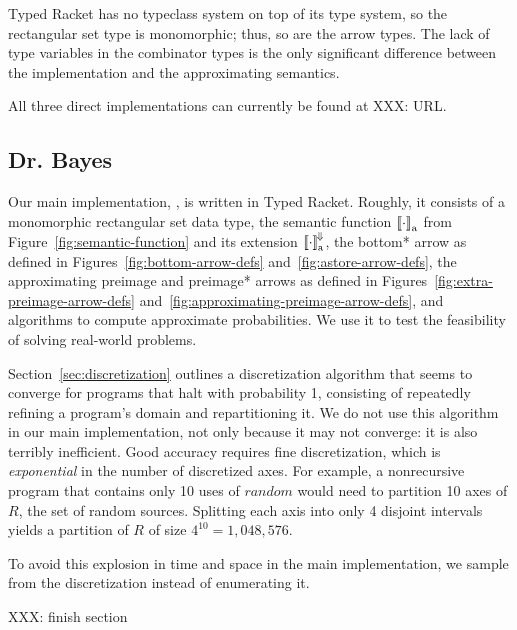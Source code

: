 \documentclass[preprint]{sigplanconf}
\newcommand{\conv}{^{\mspace{-2mu}\Downarrow\mspace{-2mu}}}
\newcommand{\gen}{_\mathrm{a}}
\begin{document}
Typed Racket has no typeclass system on top of its type system, so the rectangular set type is monomorphic; thus, so are the arrow types.
The lack of type variables in the combinator types is the only significant difference between the implementation and the approximating semantics.

All three direct implementations can currently be found at XXX: URL.

\subsection{Dr. Bayes}

Our main implementation, , is written in Typed Racket.
Roughly, it consists of a monomorphic rectangular set data type, the semantic function $\meaningof{\cdot}\gen$ from Figure~\ref{fig:semantic-function} and its extension $\meaningof{\cdot}\gen\conv$, the bottom* arrow as defined in Figures~\ref{fig:bottom-arrow-defs} and~\ref{fig:astore-arrow-defs}, the approximating preimage and preimage* arrows as defined in Figures~\ref{fig:extra-preimage-arrow-defs} and~\ref{fig:approximating-preimage-arrow-defs}, and algorithms to compute approximate probabilities.
We use it to test the feasibility of solving real-world problems.


Section~\ref{sec:discretization} outlines a discretization algorithm that seems to converge for programs that halt with probability 1, consisting of repeatedly refining a program's domain and repartitioning it.
We do not use this algorithm in our main implementation, not only because it may not converge: it is also terribly inefficient.
Good accuracy requires fine discretization, which is \emph{exponential} in the number of discretized axes.
For example, a nonrecursive program that contains only 10 uses of $random$ would need to partition 10 axes of $R$, the set of random sources.
Splitting each axis into only 4 disjoint intervals yields a partition of $R$ of size $4^{10} = 1,048,576$.

To avoid this explosion in time and space in the main implementation, we sample from the discretization instead of enumerating it.

XXX: finish section

\end{document}
